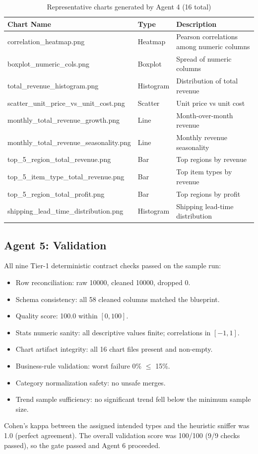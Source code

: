 \documentclass[12pt,a4paper,openany]{report}
\begin{document}
\begin{table}[H]
\centering
\caption{Representative charts generated by Agent 4 (16 total)}
\label{tab:generated-charts}
\begin{tabular}{p{6.5cm} p{3cm} p{4cm}}
\hline
Chart Name & Type & Description \\
\hline
correlation\_heatmap.png & Heatmap & Pearson correlations among numeric columns \\
boxplot\_numeric\_cols.png & Boxplot & Spread of numeric columns \\
total\_revenue\_histogram.png & Histogram & Distribution of total revenue \\
scatter\_unit\_price\_vs\_unit\_cost.png & Scatter & Unit price vs unit cost \\
monthly\_total\_revenue\_growth.png & Line & Month-over-month revenue \\
monthly\_total\_revenue\_seasonality.png & Line & Monthly revenue seasonality \\
top\_5\_region\_total\_revenue.png & Bar & Top regions by revenue \\
top\_5\_item\_type\_total\_revenue.png & Bar & Top item types by revenue \\
top\_5\_region\_total\_profit.png & Bar & Top regions by profit \\
shipping\_lead\_time\_distribution.png & Histogram & Shipping lead-time distribution \\
\hline
\end{tabular}
\end{table}

\subsection{Agent 5: Validation}
All nine Tier-1 deterministic contract checks passed on the sample run:
\begin{itemize}
	\item Row reconciliation: raw 10000, cleaned 10000, dropped 0.
	\item Schema consistency: all 58 cleaned columns matched the blueprint.
	\item Quality score: 100.0 within $[0,100]$.
	\item Stats numeric sanity: all descriptive values finite; correlations in $[-1,1]$.
	\item Chart artifact integrity: all 16 chart files present and non-empty.
	\item Business-rule validation: worst failure 0\% $\le$ 15\%.
	\item Category normalization safety: no unsafe merges.
	\item Trend sample sufficiency: no significant trend fell below the minimum sample size.
\end{itemize}
Cohen's kappa between the assigned intended types and the heuristic sniffer was 1.0 (perfect agreement). The overall validation score was 100/100 (9/9 checks passed), so the gate passed and Agent 6 proceeded.
\end{document}

